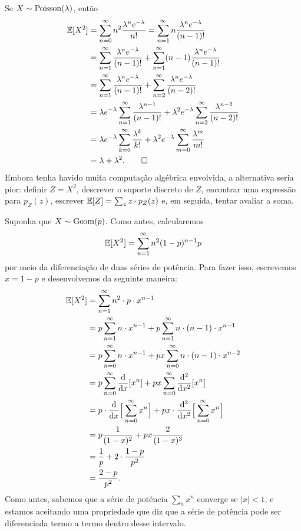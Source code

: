 \begin{example}
Se $X\sim\mathrm{Poisson}(\lambda)$, então
\begin{align}
\mathbb{E} [X^2]
&
=
\sum_{n=0}^\infty n^2 \frac{\lambda^n e^{-\lambda}}{n!}
=
\sum_{n=1}^\infty n \frac{\lambda^n e^{-\lambda}}{(n-1)!}
\\
&
=
\sum_{n=1}^\infty \frac{\lambda^n e^{-\lambda}}{(n-1)!}
+
\sum_{n=1}^\infty (n-1) \frac{\lambda^n e^{-\lambda}}{(n-1)!}
\\
&
=
\sum_{n=1}^\infty \frac{\lambda^n e^{-\lambda}}{(n-1)!}
+
\sum_{n=2}^\infty \frac{\lambda^n e^{-\lambda}}{(n-2)!}
\\
&
=
\lambda e^{-\lambda}
\sum_{n=1}^\infty \frac{\lambda^{n-1}}{(n-1)!}
+
\lambda^2 e^{-\lambda}
\sum_{n=2}^\infty \frac{\lambda^{n-2}}{(n-2)!}
\\
&
=
\lambda e^{-\lambda}
\sum_{k=0}^\infty \frac{\lambda^{k}}{k!}
+
\lambda^2 e^{-\lambda}
\sum_{m=0}^\infty \frac{\lambda^{m}}{m!}
\\
&
=
\lambda+\lambda^2
.
\qedhere
\end{align}
Embora tenha havido muita computação algébrica envolvida, a alternativa seria pior: definir $ Z = X^2 $, descrever o suporte discreto de $ Z $, encontrar uma expressão para $ p_Z(z) $, escrever $ \mathbb{E}[Z]=\sum_z z \cdot p_Z(z) $ e, em seguida, tentar avaliar a soma.
\end{example}

\begin{example}
Suponha que $X\sim\mathrm{Geom}(p)$.
Como antes, calcularemos
\[
\mathbb{E} [X^2] = \sum_{n=1}^{\infty} n^2(1-p)^{n-1}p
\]
por meio da diferenciação de duas séries de potência.
Para fazer isso, escrevemos $ x=1-p $ e desenvolvemos da seguinte maneira:
\begin{align}
\mathbb{E} [X^2]
&
=
\sum_{n=1}^{\infty} n^2 \cdot p \cdot x^{n-1}
\\
&
=
p
\sum_{n=1}^{\infty} n \cdot x^{n-1}
+
p \sum_{n=1}^{\infty} n \cdot (n-1) \cdot x^{n-1}
\\
&
=
p
\sum_{n=0}^{\infty} n \cdot x^{n-1}
+
px \sum_{n=0}^{\infty} n \cdot (n-1) \cdot x^{n-2}
\\
&
=
p
\sum_{n=0}^{\infty}
\frac{\mathrm{d} }{\mathrm{d} x}
[x^{n}]
+
px
\sum_{n=0}^{\infty}
\frac{\mathrm{d}^2 }{\mathrm{d} x^2}
[x^{n}]
\\
&
=
p
\cdot
\frac{\mathrm{d} }{\mathrm{d} x}
\Big[
\sum_{n=0}^{\infty} x^{n}
\Big]
+
px
\cdot
\frac{\mathrm{d}^2 }{\mathrm{d} x^2}
\Big[
\sum_{n=0}^{\infty} x^{n}
\Big]
\\
&
=
p
\frac{1}{(1-x)^2}
+
px
\frac{2}{(1-x)^3}
\\
&
=
\frac{1}{p}
+
2
\cdot
\frac{1-p}{p^2}
\\
&
=
\frac{2-p}{p^2}
.
\end{align}
Como antes, sabemos que a série de potência $ \sum_n x^n $ converge se $ |x|<1 $, e estamos aceitando uma propriedade que diz que a série de potência pode ser diferenciada termo a termo dentro desse intervalo.
\end{example}

